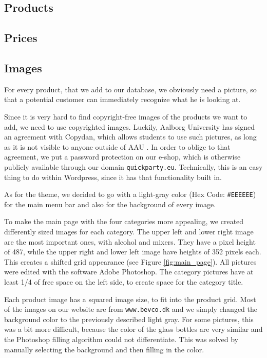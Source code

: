 \documentclass[12p]{article}
\begin{document}
\subsection{Products}

\subsection{Prices}

\subsection{Images}

For every product, that we add to our database, we obviously need a picture, so that a potential customer can immediately recognize what he is looking at. 

Since it is very hard to find copyright-free images of the products we want to add, we need to use copyrighted images. Luckily, Aalborg University has signed an agreement with Copydan, which allows students to use such pictures, as long as it is not visible to anyone outside of AAU \cite{AAUCopyrightAgreement}. In order to oblige to that agreement, we put a password protection on our e-shop, which is otherwise publicly available through our domain \texttt{quickparty.eu}. Technically, this is an easy thing to do within Wordpress, since it has that functionality built in.

As for the theme, we decided to go with a light-gray color (Hex Code: \texttt{\#EEEEEE}) for the main menu bar and also for the background of every image. 

To make the main page with the four categories more appealing, we created differently sized images for each category. The upper left and lower right image are the most important ones, with alcohol and mixers. They have a pixel height of 487, while the upper right and lower left image have heights of 352 pixels each. This creates a shifted grid appearance (see Figure \ref{fig:main_page}). All pictures were edited with the software Adobe Photoshop. The category pictures have at least 1/4 of free space on the left side, to create space for the category title.

Each product image has a squared image size, to fit into the product grid. Most of the images on our website are from \texttt{www.bevco.dk} and we simply changed the background color to the previously described light gray. For some pictures, this was a bit more difficult, because the color of the glass bottles are very similar and the Photoshop filling algorithm could  not differentiate. This was solved by manually selecting the background and then filling in the color.
\end{document}

